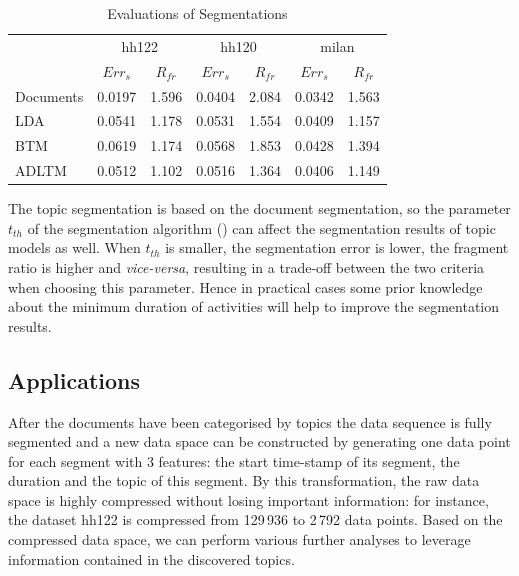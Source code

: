 \documentclass{article}
\begin{document}
{%
\begin{table}[!b]
\centering
\scriptsize
\begin{tabular}{lcccccc}
\toprule
\multirow{2}{*}{} & \multicolumn{2}{c}{hh122} & \multicolumn{2}{c}{hh120} & \multicolumn{2}{c}{milan} \\ \cmidrule(l){2-7} & $Err_s$     & $R_{fr}$     & $Err_s$     & $R_{fr}$   & $Err_s$     & $R_{fr}$     \\
\midrule
Documents           & 0.0197 & 1.596 & 0.0404 & 2.084 & 0.0342 & 1.563 \\
\ac{LDA}            & 0.0541  & 1.178 & 0.0531 & 1.554 & 0.0409 & 1.157 \\
\ac{BTM}            & 0.0619  & 1.174 & 0.0568 & 1.853 & 0.0428 & 1.394 \\
\ac{ADLTM}          & 0.0512  & 1.102 & 0.0516 & 1.364 & 0.0406 & 1.149 \\
\bottomrule
\end{tabular}
\caption{Evaluations of Segmentations}
\label{tab:cpmr}
\end{table}
}

The topic segmentation is based on the document segmentation, so the parameter $t_{th}$ of the segmentation algorithm () can affect the segmentation results of topic models as well. When $t_{th}$ is smaller, the segmentation error is lower, the fragment ratio is higher and {\em vice-versa}, resulting in a trade-off between the two criteria when choosing this parameter. Hence in practical cases some prior knowledge about the minimum duration of activities will help to improve the segmentation results.

\subsection{Applications}
After the documents have been categorised by topics the data sequence is fully segmented and a new data space can be constructed by generating one data point for each segment with 3 features: the start time-stamp of its segment, the duration and the topic of this segment. 
By this transformation, the raw data space is highly compressed without losing important information: for instance, the dataset hh122 is compressed from 129\,936 to 2\,792 data points. Based on the compressed data space, we can perform various further analyses to leverage information contained in the discovered topics.
\end{document}
